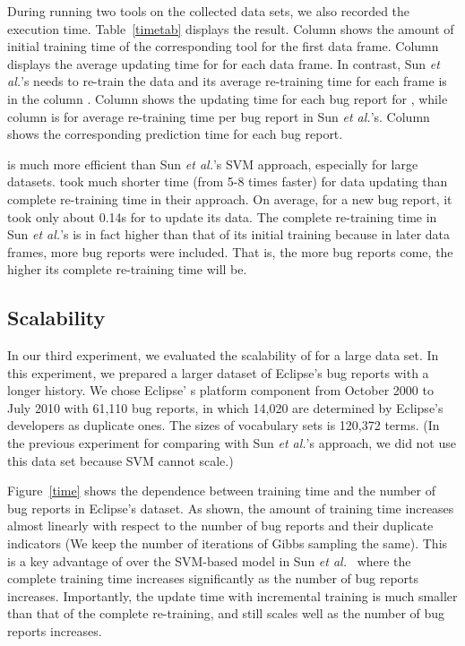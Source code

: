 During running two tools on the collected data sets, we also recorded
the execution time. Table~\ref{timetab} displays the result. Column
 shows the amount of initial training time of
the corresponding tool for the first data frame. Column  displays the average updating time for {\model} for each data
frame. In contrast, Sun {\em et al.}'s needs to re-train the data and
its average re-training time for each frame is in the column
. Column  shows the
updating time for each bug report for {\model}, while column
 is for average re-training time per bug
report in Sun {\em et al.}'s. Column 
shows the corresponding prediction time for each bug report.

{\model} is much more efficient than Sun {\em et al.}'s SVM approach,
especially for large datasets. {\model} took much shorter time (from
5-8 times faster) for data updating than complete re-training time in
their approach. On average, for a new bug report, it took only about
0.14s for {\model} to update its data.
The complete re-training time in Sun {\em et al.}'s is in fact higher
than that of its initial training because in later data frames, more bug
reports were included. That is, the more bug reports come, the higher
its complete re-training time will be.


\subsection{Scalability}

In our third experiment, we evaluated the scalability of {\model}
for a large data set. In this experiment, we prepared a larger dataset
of Eclipse's bug reports with a longer history. We chose Eclipse' s
platform component from October 2000 to July 2010 with 61,110 bug
reports, in which 14,020 are determined by Eclipse's developers as
duplicate ones.  The sizes of vocabulary sets is 120,372 terms. (In
the previous experiment for comparing {\model} with Sun {\em et al.}'s
approach, we did not use this data set because SVM cannot scale.)

Figure~\ref{time} shows the dependence between training time and the
number of bug reports in Eclipse's dataset. As shown, the amount of
training time increases almost linearly with respect to the number of
bug reports and their duplicate indicators (We keep the number of
iterations of Gibbs sampling the same). This is a key advantage of
{\model} over the SVM-based model in Sun {\em et al.}~\cite{davidlo10}
where the complete training time increases significantly as the number
of bug reports increases. Importantly, the update time with
incremental training is much smaller than that of the complete
re-training, and {\model} still scales well as the number of bug
reports increases.

